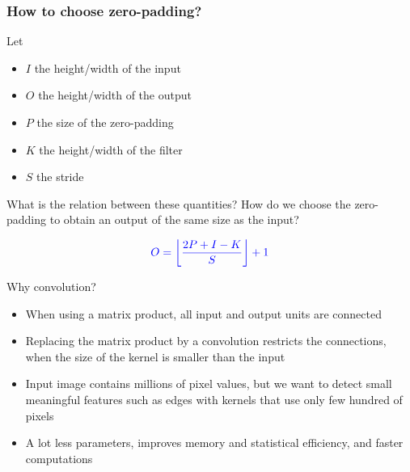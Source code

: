 \begin{frame}
	\frametitle{How to choose zero-padding?}
	
	Let 
	
	\smallskip 
	
	\begin{itemize}
		\item $I$ the height/width of the input
			
		\smallskip 
		
		\item $O$ the height/width of the output	
		
		\smallskip 
		
		\item $P$ the size of the zero-padding
			
		\smallskip 
		
		\item $K$ the height/width of the filter	
		
		\smallskip 
		
		\item $S$ the stride
	\end{itemize}
	
	\medskip 
	
	What is the relation between these quantities? How do we choose the zero-padding to obtain an output of the same size as the input?
	
	\pause 
	
	\bigskip 
	
	$$
	\textcolor{blue}{O = \left\lfloor \frac{2P + I - K}{S} \right\rfloor + 1}
	$$

	
\end{frame}


\begin{frame}{Why convolution?}
	\begin{itemize}
		\item When using a matrix product, all input and output units are connected
		
		\medskip 
		
		\item Replacing the matrix product by a convolution restricts the connections, when the size of the kernel is smaller than the input
		
		\medskip 
		
		\item Input image contains millions of pixel values, but we want to detect small meaningful features such as edges with kernels that use only few hundred of pixels
		
		\medskip 
		
		\item A lot less parameters, improves memory and statistical efficiency, and faster computations
	\end{itemize}
\end{frame}


